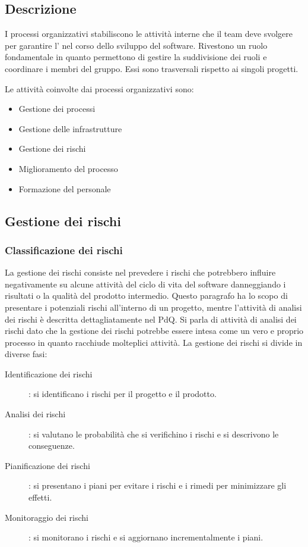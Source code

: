 \documentclass[../norme-di-progetto.tex]{subfiles}
\begin{document}
\subsection{Descrizione}%
\label{sub:processi_organizzativi/descrizione}

I processi organizzativi stabiliscono le attività interne che il team deve svolgere per garantire l' nel corso dello sviluppo del software.
Rivestono un ruolo fondamentale in quanto permettono di gestire la suddivisione dei ruoli e coordinare i membri del gruppo.
Essi sono trasversali rispetto ai singoli progetti.

Le attività coinvolte dai processi organizzativi sono:

\begin{itemize}
  \item Gestione dei processi
  \item Gestione delle infrastrutture
  \item Gestione dei rischi
  \item Miglioramento del processo
  \item Formazione del personale
\end{itemize}

\subsection{Gestione dei rischi}%
\label{sub:gestione_dei_rischi}

\subsubsection{Classificazione dei rischi}%
\label{subs:classificazione_dei_rischi}
La gestione dei rischi consiste nel prevedere i rischi che potrebbero influire negativamente su alcune attività del ciclo di vita del software danneggiando i risultati o la qualità del prodotto intermedio.
Questo paragrafo ha lo scopo di presentare i potenziali rischi all'interno di un progetto, mentre l'attività di analisi dei rischi è descritta dettagliatamente nel PdQ.
Si parla di attività di analisi dei rischi dato che la gestione dei rischi potrebbe essere intesa come un vero e proprio processo in quanto racchiude molteplici attività. La gestione dei rischi si divide in diverse fasi:

\begin{description}
  \item [Identificazione dei rischi]: si identificano i rischi per il progetto e il prodotto.
  \item [Analisi dei rischi]: si valutano le probabilità che si verifichino i rischi e si descrivono le conseguenze.
  \item [Pianificazione dei rischi]: si presentano i piani per evitare i rischi e i rimedi per minimizzare gli effetti.
  \item [Monitoraggio dei rischi]: si monitorano i rischi e si aggiornano incrementalmente i piani.
\end{description}
\end{document}
